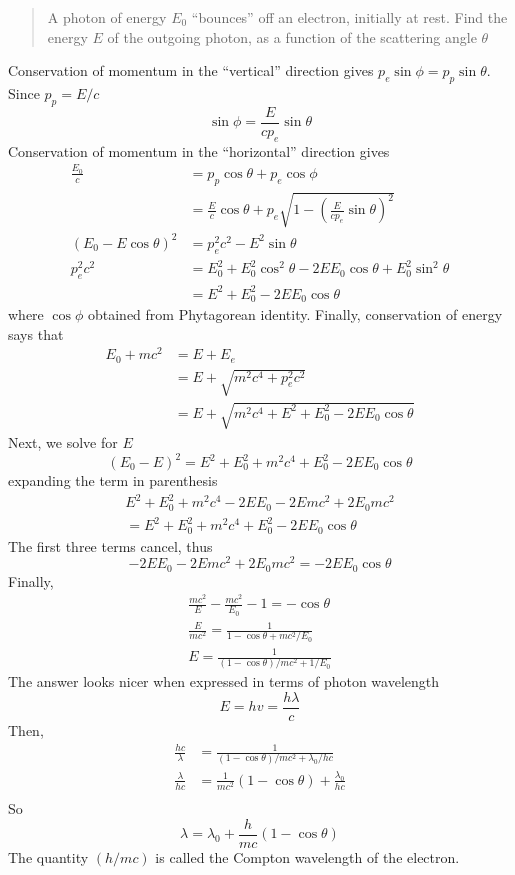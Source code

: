 \documentclass[../../../main.tex]{subfiles}
\begin{document}
\begin{quote}
    A photon of energy $E_0$ “bounces” off an electron, initially at rest. Find the energy $E$ of the outgoing photon, as a function of the scattering angle $\theta$ 
\end{quote}
Conservation of momentum in the “vertical” direction gives $p_e \sin \phi = p_p \sin \theta$. Since $p_p = E/c$
\begin{equation*}
    \sin \phi=\frac{E}{c p_e}\sin \theta
\end{equation*}
Conservation of momentum in the “horizontal” direction gives
\begin{align*}
    \frac{E_0}{c}&=p_p \cos \theta + p_e \cos \phi\\
    &=\frac{E}{c}\cos \theta+ p_e \sqrt{1-(\frac{E}{c p_e}\sin \theta)^2}\\
    (E_0-E\cos\theta)^2&=p_e^2c^2-E^2\sin\theta\\
    p_e^2c^2&=E_0^2+E_0^2\cos^2\theta-2EE_0\cos\theta+E_0^2\sin^2\theta\\
    &=E^2+E_0^2-2EE_0\cos\theta
\end{align*}
where $ \cos \phi$ obtained from Phytagorean identity. Finally, conservation of energy says that
\begin{align*}
    E_0 + mc^2& = E + E_e \\
    &=E+ \sqrt{m^2c^4 + p^2_e c^2}\\
    &=E+ \sqrt{m^2c^4 + E^2+E_0^2-2EE_0\cos\theta}
\end{align*}
Next, we solve for $E$
\begin{equation*}
    (E_0-E)^2=E^2 + E_0^2 + m^2c^4 +E_0^2-2EE_0\cos\theta
\end{equation*}
expanding the term in parenthesis
\begin{multline*}
    E^2 + E_0^2 + m^2c^4 - 2EE_0-2Emc^2 + 2E_0mc^2\\=E^2 + E_0^2 + m^2c^4 +E_0^2-2EE_0\cos\theta
\end{multline*}
The first three terms cancel, thus
\begin{equation*}
    - 2EE_0-2Emc^2 + 2E_0mc^2=-2EE_0\cos\theta
\end{equation*}
Finally,
\begin{align*}
    \frac{mc^2}{E}-\frac{mc^2}{E_0}-1=-\cos\theta\\
    \frac{E}{mc^2}=\frac{1}{1-\cos\theta+mc^2/E_0}\\
    E=\frac{1}{(1-\cos\theta)/mc^2+1/E_0}
\end{align*}
The answer looks nicer when expressed in terms of photon wavelength
\begin{equation*}
    E=hv=\frac{h\lambda}{c}
\end{equation*}
Then,
\begin{align*}
    \frac{hc}{\lambda}&=\frac{1}{(1-\cos\theta)/mc^2+\lambda_0/hc}\\
    \frac{\lambda}{hc}&=\frac{1}{mc^2}(1-\cos\theta)+\frac{\lambda_0}{hc}\\
\end{align*}
So
\begin{equation*}
    \lambda=\lambda_0+\frac{h}{mc}(1-\cos\theta)
\end{equation*}
The quantity $ (h/mc)$ is called the Compton wavelength of the electron. 
\end{document}
